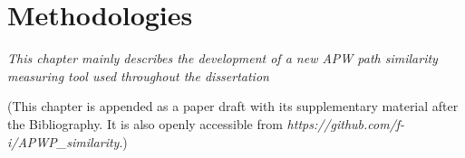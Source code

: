 \chapter{Methodologies}\label{chap:Metho}
\textit{This chapter mainly describes the development of a new APW path
similarity measuring tool used throughout the dissertation}
\vfill
\minitoc\newpage

(This chapter is appended as a paper draft with its supplementary material
after the Bibliography. It is also openly accessible from
\emph{https://github.com/f-i/APWP\_similarity}.)
